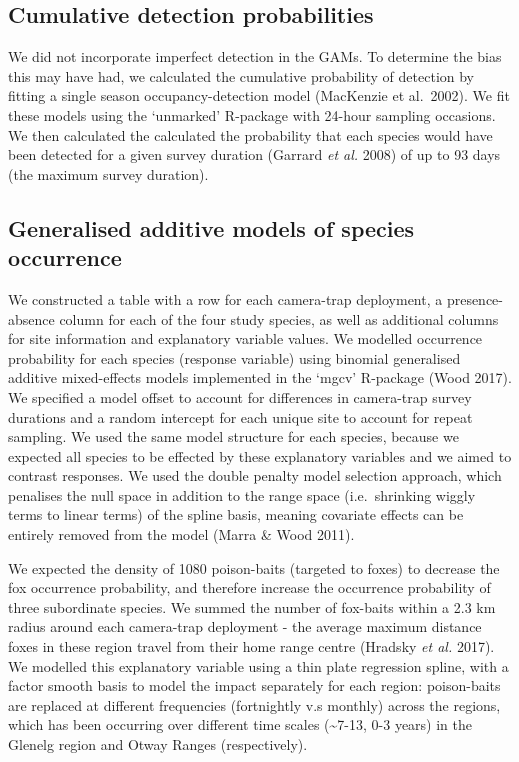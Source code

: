 \documentclass[11pt,a4paper,titlepage,twoside,openright]{style/unimelbthesis}
\begin{document}
\begin{mainmatter}
\hypertarget{cumulative-detection-probabilities}{%
\subsection{Cumulative detection probabilities}\label{cumulative-detection-probabilities}}

We did not incorporate imperfect detection in the GAMs. To determine the bias this may have had, we calculated the cumulative probability of detection by fitting a single season occupancy-detection model (MacKenzie et al.~2002). We fit these models using the `unmarked' R-package with 24-hour sampling occasions. We then calculated the calculated the probability that each species would have been detected for a given survey duration (Garrard \emph{et al.} 2008) of up to 93 days (the maximum survey duration).

\hypertarget{generalised-additive-models-of-species-occurrence}{%
\subsection{Generalised additive models of species occurrence}\label{generalised-additive-models-of-species-occurrence}}

We constructed a table with a row for each camera-trap deployment, a presence-absence column for each of the four study species, as well as additional columns for site information and explanatory variable values. We modelled occurrence probability for each species (response variable) using binomial generalised additive mixed-effects models implemented in the `mgcv' R-package (Wood 2017). We specified a model offset to account for differences in camera-trap survey durations and a random intercept for each unique site to account for repeat sampling. We used the same model structure for each species, because we expected all species to be effected by these explanatory variables and we aimed to contrast responses. We used the double penalty model selection approach, which penalises the null space in addition to the range space (i.e.~shrinking wiggly terms to linear terms) of the spline basis, meaning covariate effects can be entirely removed from the model (Marra \& Wood 2011).

We expected the density of 1080 poison-baits (targeted to foxes) to decrease the fox occurrence probability, and therefore increase the occurrence probability of three subordinate species. We summed the number of fox-baits within a 2.3 km radius around each camera-trap deployment - the average maximum distance foxes in these region travel from their home range centre (Hradsky \emph{et al.} 2017). We modelled this explanatory variable using a thin plate regression spline, with a factor smooth basis to model the impact separately for each region: poison-baits are replaced at different frequencies (fortnightly v.s monthly) across the regions, which has been occurring over different time scales (\textasciitilde7-13, 0-3 years) in the Glenelg region and Otway Ranges (respectively).


\end{mainmatter}
\end{document}

